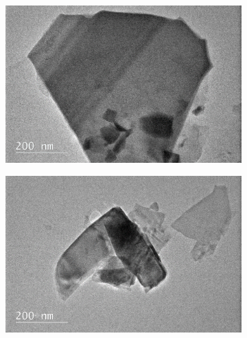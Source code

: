 \begin{figure}[!ht]
	\begin{center}
		\begin{subfigure}[b]{0.65\textwidth}
			\includegraphics[width=\textwidth]{In/TEMImage1.png}
			\caption{}
			\label{fig:InTEMImage1}
		\end{subfigure}

		\begin{subfigure}[b]{0.65\textwidth}
			\includegraphics[width=\textwidth]{In/TEMImage2.png}
			\caption{}
			\label{fig:InTEMImage2}
		\end{subfigure}


\end{center}
\end{figure}
